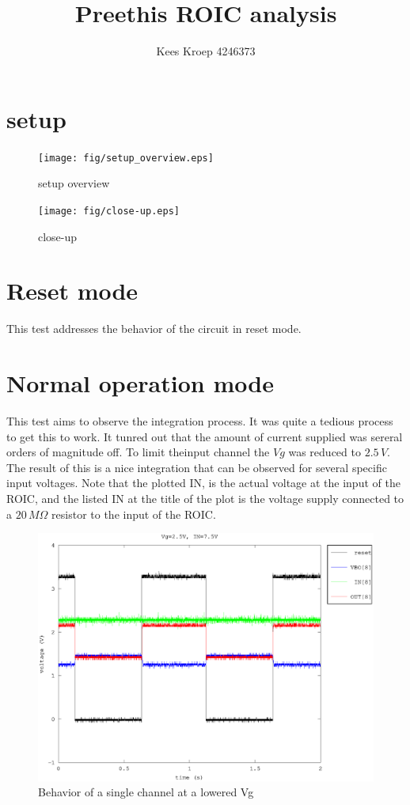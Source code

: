 \documentclass{article}
\title{Preethis ROIC analysis}
\author{Kees Kroep 4246373}
\begin{document}
  \maketitle

\section{setup}\label{sec:setup}
\pgfversion



\begin{figure}[h]
	\centering
	\texttt{[image: fig/setup\_overview.eps]}
	\caption{setup overview}
	\label{fig:setup_overview}
\end{figure}

\begin{figure}[h]
	\centering
	\texttt{[image: fig/close-up.eps]}
	\caption{close-up}
	\label{fig:close-up}
\end{figure}

\clearpage

\section{Reset mode}
This test addresses the behavior of the circuit in reset mode. 




\section{Normal operation mode}
This test aims to observe the integration process. It was quite a tedious process to get this to work. It tunred out that the amount of current supplied was sereral orders of magnitude off. To limit theinput channel the $Vg$ was reduced to $2.5\,V$. The result of this is a nice integration that can be observed for several specific input voltages. Note that the plotted IN, is the actual voltage at the input of the ROIC, and the listed IN at the title of the plot is the voltage supply connected to a $20\,M\Omega$ resistor to the input of the ROIC.



\begin{figure}[h]
	\centering
	\includegraphics[width=0.6\linewidth]{fig/Vg_2-5_IN_7-5.eps}
	\caption{Behavior of a single channel at a lowered Vg}
	\label{fig:Vg_2-5_IN_7-5}
\end{figure}
\end{document}
